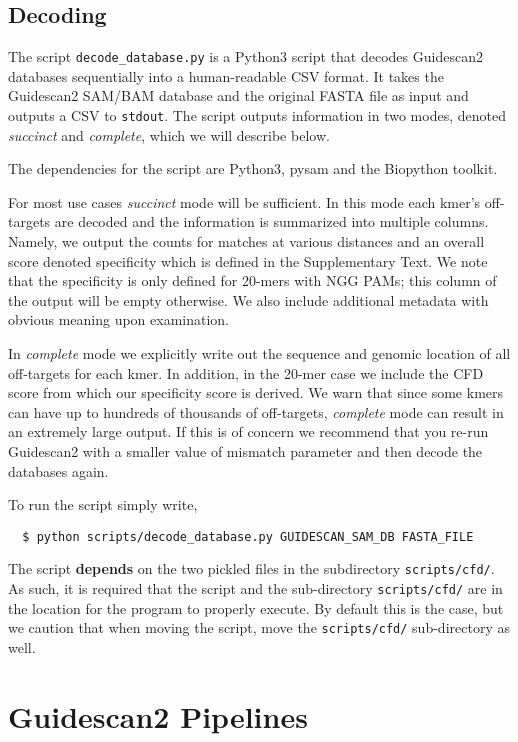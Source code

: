 \documentclass[11pt]{article}
\begin{document}
\subsection{Decoding}

The script \texttt{decode\_database.py} is a Python3 script that decodes
Guidescan2 databases sequentially into a human-readable CSV format. It
takes the Guidescan2 SAM/BAM database and the original FASTA file as
input and outputs a CSV to \texttt{stdout}. The script outputs
information in two modes, denoted {\it succinct} and {\it
  complete}, which we will describe below.

The dependencies for the script are Python3, pysam and the Biopython toolkit.

For most use cases {\it succinct} mode will be sufficient. In this
mode each kmer's off-targets are decoded and the information is
summarized into multiple columns. Namely, we output the counts for
matches at various distances and an overall score denoted specificity
which is defined in the Supplementary Text. We note that the
specificity is only defined for 20-mers with NGG PAMs; this column of
the output will be empty otherwise. We also include additional
metadata with obvious meaning upon examination.

In {\it complete} mode we explicitly write out the sequence and
genomic location of all off-targets for each kmer. In addition, in the
20-mer case we include the CFD score from which our specificity score
is derived. We warn that since some kmers can have up to hundreds of
thousands of off-targets, {\it complete} mode can result in an
extremely large output. If this is of concern we recommend that you
re-run Guidescan2 with a smaller value of mismatch parameter and then
decode the databases again.

To run the script simply write,
\begin{verbatim}
  $ python scripts/decode_database.py GUIDESCAN_SAM_DB FASTA_FILE 
\end{verbatim}
The script \textbf{depends} on the two pickled files in the
subdirectory \texttt{scripts/cfd/}. As such, it is required that the
script and the sub-directory \texttt{scripts/cfd/} are in the location
for the program to properly execute. By default this is the
case, but we caution that when moving the script, move the
\texttt{scripts/cfd/} sub-directory as well.

\section{Guidescan2 Pipelines}
\end{document}
